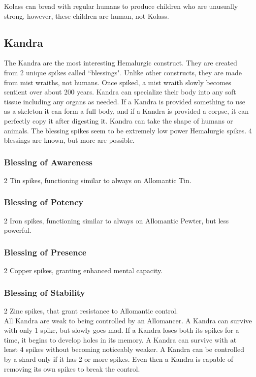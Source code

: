 \documentclass[conference]{IEEEtran}
\begin{document}
Kolass can bread with regular humans to produce children who are unusually strong, however, these children are human, not Kolass.
\subsection*{Kandra}
The Kandra are the most interesting Hemalurgic construct.  They are created from 2 unique spikes called ``blessings".  Unlike other constructs, they are made from mist wraiths, not humans.  Once spiked, a mist wraith slowly becomes sentient over about 200 years.  Kandra can specialize their body into any soft tissue including any organs as needed.  If a Kandra is provided something to use as a skeleton it can form a full body, and if a Kandra is provided a corpse, it can perfectly copy it after digesting it.  Kandra can take the shape of humans or animals.
The blessing spikes seem to be extremely low power Hemalurgic spikes.  4 blessings are known, but more are possible.
\subsubsection*{Blessing of Awareness}
2 Tin spikes, functioning similar to always on Allomantic Tin.
\subsubsection*{Blessing of Potency}
2 Iron spikes, functioning similar to always on Allomantic Pewter, but less powerful.
\subsubsection*{Blessing of Presence}
2 Copper spikes, granting enhanced mental capacity.
\subsubsection*{Blessing of Stability}
2 Zinc spikes, that grant resistance to Allomantic control.\\

All Kandra are weak to being controlled by an Allomancer.
A Kandra can survive with only 1 spike, but slowly goes mad.  
If a Kandra loses both its spikes for a time, it begins to develop holes in its memory.
A Kandra can survive with at least 4 spikes without becoming noticeably weaker.
A Kandra can be controlled by a shard only if it has 2 or more spikes.  Even then a Kandra is capable of removing its own spikes to break the control.
\end{document}
